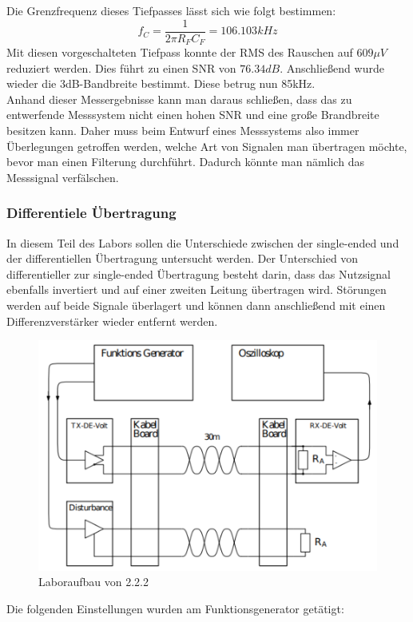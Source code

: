 \documentclass[a4paper,12pt]{article}
\begin{document}
	\newline
	Die Grenzfrequenz dieses Tiefpasses lässt sich wie folgt bestimmen:
	\[
		f_C = \frac{1}{2\pi R_F C_F} = 106.103kHz
	\]
	Mit diesen vorgeschalteten Tiefpass konnte der RMS des Rauschen auf $609\mu V$ reduziert werden. Dies führt zu einen SNR von $76.34dB$. Anschließend wurde wieder die 3dB-Bandbreite bestimmt. Diese betrug nun 85kHz. \\
	Anhand dieser Messergebnisse kann man daraus schließen, dass das zu entwerfende Messsystem nicht einen hohen SNR und eine große Brandbreite besitzen kann. Daher muss beim Entwurf eines Messsystems also immer Überlegungen getroffen werden, welche Art von Signalen man übertragen möchte, bevor man einen Filterung durchführt. Dadurch könnte man nämlich das Messsignal verfälschen.
	\newpage
	\subsubsection{Differentiele Übertragung}
	In diesem Teil des Labors sollen die Unterschiede zwischen der single-ended und der differentiellen Übertragung untersucht werden. Der Unterschied von differentieller zur single-ended Übertragung besteht darin, dass das Nutzsignal ebenfalls invertiert und auf einer zweiten Leitung übertragen wird. Störungen werden auf beide Signale überlagert und können dann anschließend mit einen Differenzverstärker wieder entfernt werden.
	\begin{figure}[h]
		\centering
		\includegraphics[width=12cm]{img/Laboraufbau2_2_2}
		\caption{Laboraufbau von 2.2.2}
	\end{figure}
	\newline
	Die folgenden Einstellungen wurden am Funktionsgenerator getätigt:
\end{document}
